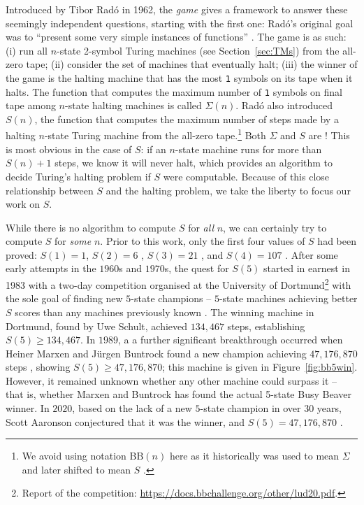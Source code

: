 \documentclass[a4paper,british]{article}
\theoremstyle{definition} %
\numberwithin{equation}{section}
\theoremstyle{definition} %
\newcommand{\sone}{\texttt{1}\xspace}
\newcommand{\BBtheFifth}{47{,}176{,}870}
\newcommand{\radofull}{Tibor Rad\'o\xspace}
\newcommand{\rado}{Rad\'o\xspace}
\begin{document}
Introduced by \radofull in 1962, the \textit{\BBfull game} gives a framework to answer these seemingly independent questions, starting with the first one: \rado's original goal was to ``present some very simple instances of \noncomput functions'' \cite{Rado_1962}. The game is as such: (i) run all $n$-state 2-symbol Turing machines (see Section~\ref{sec:TMs}) from the all-zero tape; (ii) consider the set of machines that eventually halt; (iii) the winner of the game is the halting machine that has the most \sone symbols on its tape when it halts. The function that computes the maximum number of \sone symbols on final tape among $n$-state halting machines is called $\Sigma(n)$. \rado also introduced $S(n)$, the function that computes the maximum number of steps made by a halting $n$-state Turing machine from the all-zero tape.\footnote{We avoid using notation $\text{BB}(n)$ here as it historically was used to mean $\Sigma$ \cite{Rado_1962, 10.5555/1151785.1151794} and later shifted to mean $S$ \cite{BusyBeaverFrontier,sterin_2022_14955828}.} Both $\Sigma$ and $S$ are \noncomput! This is most obvious in the case of $S$: if an $n$-state machine runs for more than $S(n)+1$ steps, we know it will never halt, which provides an algorithm to decide Turing's halting problem if $S$ were computable. Because of this close relationship between $S$ and the halting problem, we take the liberty to focus our work on $S$.

While there is no algorithm to compute $S$ for \textit{all} $n$, we can certainly try to compute $S$ for \textit{some} $n$. Prior to this work, only the first four values of $S$ had been proved: $S(1)=1$, $S(2)=6$ \cite{Rado_1962}, $S(3) = 21$ \cite{Lin1963}, and $S(4) = 107$ \cite{Brady83}. After some early attempts in the $1960$s and $1970$s, the quest for $S(5)$ started in earnest in 1983 with a two-day competition organised at the University of Dortmund\footnote{Report of the competition: \url{https://docs.bbchallenge.org/other/lud20.pdf}.} with the sole goal of finding new $5$-state champions -- \ie $5$-state machines achieving better $S$ scores than any machines previously known \cite{PMichel_website,michel2019busy}. The winning machine in Dortmund, found by Uwe Schult, achieved $134,467$ steps, establishing $S(5) \geq 134,467$. In $1989$, a a further significant breakthrough occurred when Heiner Marxen and J\"urgen Buntrock found a new champion achieving $\BBtheFifth$ steps \cite{Marxen_1990}, showing $S(5) \geq \BBtheFifth$; this machine is given in Figure~\ref{fig:bb5win}. However, it remained unknown whether any other machine could surpass it -- that is, whether Marxen and Buntrock has found the actual 5-state Busy Beaver winner. In $2020$, based on the lack of a new $5$-state champion in over $30$ years, Scott Aaronson conjectured that it was the winner, and $S(5) = \BBtheFifth$ \cite{BusyBeaverFrontier}.
\end{document}
